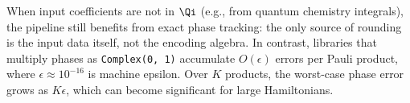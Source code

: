 \begin{remark}
When input coefficients are not in $\Qi$ (e.g., from quantum
chemistry integrals), the pipeline still benefits from exact phase
tracking: the only source of rounding is the input data itself,
not the encoding algebra.  In contrast, libraries that multiply
phases as \texttt{Complex(0, 1)} accumulate $O(\epsilon)$ errors
per Pauli product, where $\epsilon \approx 10^{-16}$ is machine
epsilon.  Over $K$ products, the worst-case phase error grows as
$K\epsilon$, which can become significant for large Hamiltonians.
\end{remark}
